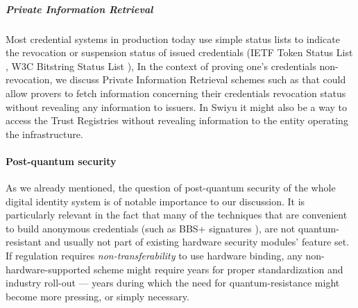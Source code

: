 \subparagraph{Private Information Retrieval} Most credential systems in production today use simple status lists to indicate the revocation or suspension status of issued credentials (IETF Token Status List \cite{TSL}, W3C Bitstring Status List \cite{W3C-status-lists}), In the context of proving one's credentials non-revocation, we discuss Private Information Retrieval schemes such as \cite{MW22} that could allow provers to fetch information concerning their credentials revocation status without revealing any information to issuers. In Swiyu \cite{Swiyu} it might also be a way to access the Trust Registries without revealing information to the entity operating the infrastructure.

\paragraph{Post-quantum security} As we already mentioned, the question of post-quantum security of the whole digital identity system is of notable importance to our discussion.
It is particularly relevant in the fact that many of the techniques that are convenient to build anonymous credentials (such as BBS+ signatures \cite{ASM06}), are not quantum-resistant and usually not part of existing hardware security modules' feature set. If regulation requires \emph{non-transferability} to use hardware binding, any non-hardware-supported scheme might require years for proper standardization and industry roll-out --- years during which the need for quantum-resistance might become more pressing, or simply necessary.
